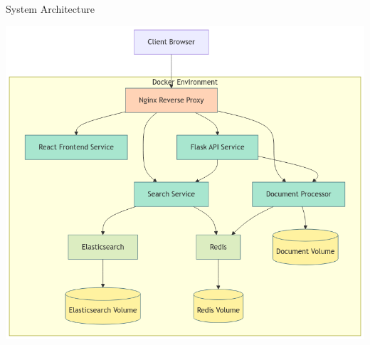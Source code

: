 \documentclass[notes]{beamer}
\begin{document}
\begin{frame}{System Architecture}
    
    \vspace*{\fill}
    \begin{center}
        \includegraphics[height=0.84\textheight,keepaspectratio]{systemarch.png}
    \end{center}
    \vspace*{\fill}
\end{frame}
\end{document}

